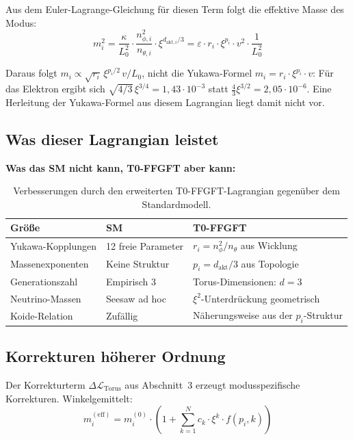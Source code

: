 Aus dem Euler-Lagrange-Gleichung für diesen Term folgt die
effektive Masse des Modus:
\begin{equation}
    m_i^2 = \frac{\kappa}{L_0^2} \cdot \frac{n_{\phi,i}^2}{n_{\theta,i}}
    \cdot \xi^{d_{\text{akt},i}/3}
    = \varepsilon \cdot r_i \cdot \xi^{p_i} \cdot v^2 \cdot \frac{1}{L_0^2}
\end{equation}

Daraus folgt $m_i \propto \sqrt{r_i}\,\xi^{p_i/2}\,v/L_0$, nicht die
Yukawa-Formel $m_i = r_i \cdot \xi^{p_i} \cdot v$: Für das Elektron ergibt
sich $\sqrt{4/3}\,\xi^{3/4} = 1{,}43 \cdot 10^{-3}$ statt
$\tfrac{4}{3}\xi^{3/2} = 2{,}05 \cdot 10^{-6}$. Eine Herleitung der
Yukawa-Formel aus diesem Lagrangian liegt damit nicht vor.

\subsection{Was dieser Lagrangian leistet}

\textbf{Was das SM nicht kann, T0-FFGFT aber kann:}

\begin{table}[htbp]
\centering\footnotesize
\begin{tabular}{lll}
\toprule
\textbf{Größe} & \textbf{SM} & \textbf{T0-FFGFT} \\
\midrule
Yukawa-Kopplungen & 12 freie Parameter & $r_i = n_\phi^2/n_\theta$ aus Wicklung \\
Massenexponenten  & Keine Struktur     & $p_i = d_{\text{akt}}/3$ aus Topologie \\
Generationszahl   & Empirisch 3        & Torus-Dimensionen: $d=3$ \\
Neutrino-Massen   & Seesaw ad hoc      & $\xi^2$-Unterdrückung geometrisch \\
Koide-Relation    & Zufällig           & Näherungsweise aus der $p_i$-Struktur \\
\bottomrule
\end{tabular}
\caption{Verbesserungen durch den erweiterten T0-FFGFT-Lagrangian
gegenüber dem Standardmodell.}
\label{tab:verbesserungen}
\end{table}

\subsection{Korrekturen höherer Ordnung}

Der Korrekturterm $\Delta\mathcal{L}_{\text{Torus}}$ aus
Abschnitt~3 erzeugt modusspezifische Korrekturen. Winkelgemittelt:
\begin{equation}
    m_i^{(\text{eff})} = m_i^{(0)} \cdot
    \left(1 + \sum_{k=1}^{N} c_k \cdot \xi^k \cdot f(p_i, k)\right)
\end{equation}


